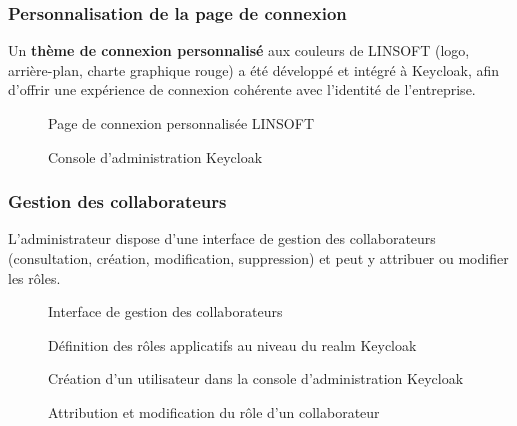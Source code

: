 \subsubsection{Personnalisation de la page de connexion}
Un \textbf{thème de connexion personnalisé} aux couleurs de LINSOFT (logo, arrière-plan,
charte graphique rouge) a été développé et intégré à Keycloak, afin d'offrir une expérience de
connexion cohérente avec l'identité de l'entreprise.

\begin{figure}[H]\centering
  \caption{Page de connexion personnalisée LINSOFT}\label{fig:kc-login}
\end{figure}

\begin{figure}[H]\centering
  \caption{Console d'administration Keycloak}\label{fig:kc-admin}
\end{figure}

\subsubsection{Gestion des collaborateurs}
L'administrateur dispose d'une interface de gestion des collaborateurs (consultation,
création, modification, suppression) et peut y attribuer ou modifier les rôles.

\begin{figure}[H]\centering
  \caption{Interface de gestion des collaborateurs}\label{fig:users}
\end{figure}

\begin{figure}[H]\centering
  \caption{Définition des rôles applicatifs au niveau du realm Keycloak}\label{fig:kc-roles}
\end{figure}

\begin{figure}[H]\centering
  \caption{Création d'un utilisateur dans la console d'administration Keycloak}\label{fig:kc-adduser}
\end{figure}

\begin{figure}[H]\centering
  \caption{Attribution et modification du rôle d'un collaborateur}\label{fig:role-assign}
\end{figure}

